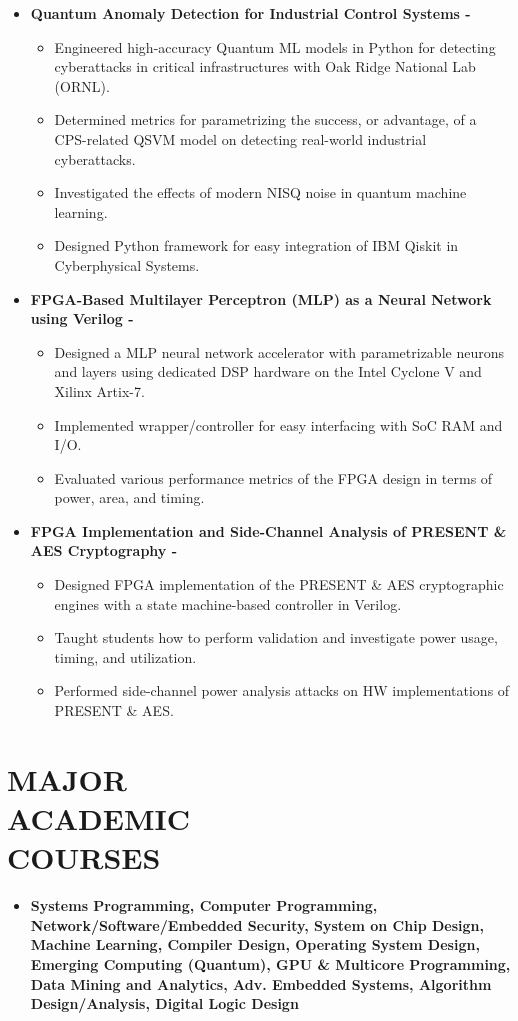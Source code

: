 \documentclass[line,margin,9pt]{res}
\begin{document}
\begin{resume}
\begin{itemize}
\item \textbf{Quantum Anomaly Detection for Industrial Control Systems -} 
\begin{itemize}
\item Engineered high-accuracy Quantum ML models in Python for detecting cyberattacks in critical infrastructures with Oak Ridge National Lab (ORNL).
\item Determined metrics for parametrizing the success, or advantage, of a CPS-related QSVM model on detecting real-world industrial cyberattacks.
\item Investigated the effects of modern NISQ noise in quantum machine learning.
\item Designed Python framework for easy integration of IBM Qiskit in Cyberphysical Systems.
\end{itemize}

\item \textbf{FPGA-Based Multilayer Perceptron (MLP) as a Neural Network using Verilog -}
\begin{itemize}
\item Designed a MLP neural network accelerator with parametrizable neurons and layers using dedicated DSP hardware on the Intel Cyclone V and Xilinx Artix-7.
\item Implemented wrapper/controller for easy interfacing with SoC RAM and I/O.
\item Evaluated various performance metrics of the FPGA design in terms of power, area, and timing.
\end{itemize}

\item \textbf{FPGA Implementation and Side-Channel Analysis of PRESENT \& AES Cryptography -} 
\begin{itemize}
\item Designed FPGA implementation of the PRESENT \& AES cryptographic engines with a state machine-based controller in Verilog.
\item Taught students how to perform validation and investigate power usage, timing, and utilization.
\item Performed side-channel power analysis attacks on HW implementations of PRESENT \& AES.
\end{itemize}
\end{itemize}

\section{MAJOR\\ACADEMIC\\COURSES}
\begin{itemize}
\item \bf Systems Programming,
\bf Computer Programming,
\bf Network/Software/Embedded Security,
\bf System on Chip Design,
\bf Machine Learning,
\bf Compiler Design,
\bf Operating System Design,
\bf Emerging Computing (Quantum),
\bf GPU \& Multicore Programming,
\bf Data Mining and Analytics,
\bf Adv. Embedded Systems,
\bf Algorithm Design/Analysis,
\bf Digital Logic Design
\end{itemize}


\end{resume}
\end{document}
